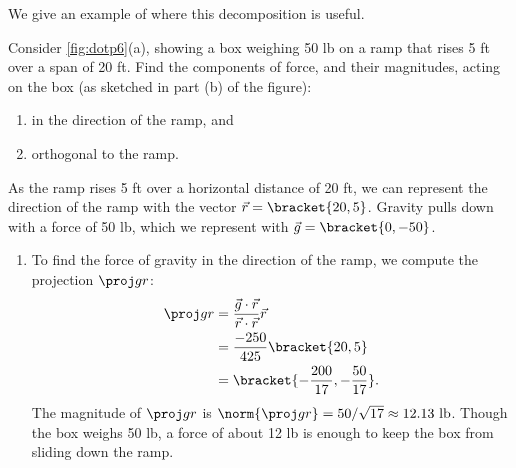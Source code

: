 We give an example of where this decomposition is useful.

\begin{example}\label{ex_dotp6}%
Consider \autoref{fig:dotp6}(a), showing a box weighing 50 lb on a ramp that rises 5 ft over a span of 20 ft. Find the components of force, and their magnitudes, acting on the box (as sketched in part (b) of the figure):
%
%
\begin{enumerate}
	\item in the direction of the ramp, and
	\item	orthogonal to the ramp.
\end{enumerate}
\solution
As the ramp rises 5 ft over a horizontal distance of 20 ft, we can represent the direction of the ramp with the vector $\vec r=\bracket{20,5}$. Gravity pulls down with a force of 50 lb, which we represent with $\vec g =\bracket{0,-50}$. 
\begin{enumerate}
	\item To find the force of gravity in the direction of the ramp, we compute the projection $\proj gr$:\vspace{-.5\baselineskip}
	\begin{align*}
	\proj gr &= \frac{\vec g\cdot\vec r}{\vec r\cdot\vec r}\vec r\\
	&=  \frac{-250}{425}\bracket{20,5}\\
	&=\bracket{-\frac{200}{17},-\frac{50}{17}}%
	.
	\end{align*}
	The magnitude of $\proj gr$ is $\norm{\proj gr} = 50/\sqrt{17} \approx 12.13\text{ lb}$. Though the box weighs 50 lb, a force of about 12 lb is enough to keep the box from sliding down the ramp.
	

\end{enumerate}
\end{example}
